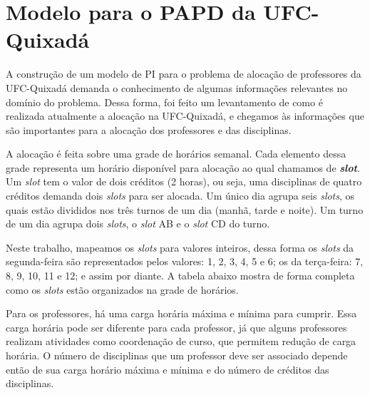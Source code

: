 \chapter{Modelo para o PAPD da UFC-Quixadá}
\label{cap:modelo-para-o-papd}

A construção de um modelo de PI para o problema de alocação de professores da UFC-Quixadá demanda o conhecimento de algumas informações relevantes no domínio do problema. Dessa forma, foi feito um levantamento de como é realizada atualmente a alocação na UFC-Quixadá, e chegamos às informações que são importantes para a alocação dos professores e das disciplinas. 

A alocação é feita sobre uma grade de horários semanal. Cada elemento dessa grade representa um horário disponível para alocação ao qual chamamos de \textbf{\textit{slot}}. Um \textit{slot} tem o valor de dois créditos (2 horas), ou seja, uma disciplinas de quatro créditos demanda dois \textit{slots} para ser alocada. Um único dia agrupa seis \textit{slots}, os quais estão divididos nos três turnos de um dia (manhã, tarde e noite). Um turno de um dia agrupa dois \textit{slots}, o \textit{slot} AB e o \textit{slot} CD do turno. 

Neste trabalho, mapeamos os \textit{slots} para valores inteiros, dessa forma os \textit{slots} da segunda-feira são representados pelos valores: 1, 2, 3, 4, 5 e 6; os da terça-feira: 7, 8, 9, 10, 11 e 12; e assim por diante. A tabela abaixo mostra de forma completa como os \textit{slots} estão organizados na grade de horários.

\begin{figure}[htbp]
	\centering
\end{figure}


Para os professores, há uma carga horária máxima e mínima para cumprir. Essa carga horária pode ser diferente para cada professor, já que alguns professores realizam atividades como coordenação de curso, que permitem redução de carga horária. O número de disciplinas que um professor deve ser associado depende então de sua carga horário máxima e mínima e do número de créditos das disciplinas. 

